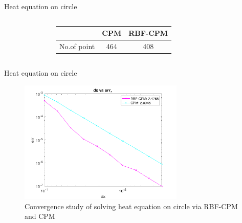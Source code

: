 \documentclass{beamer}
\begin{document}
\begin{frame}{Heat equation on circle}
\begin{columns}
\begin{figure}
\begin{subfigure}
            \end{subfigure}
        \end{figure}
    \pause
        \begin{table}[]
            \centering
            \begin{tabular}{c|c|c}
                 &  CPM & RBF-CPM\\
                 \hline \hline
                No.of point & 464 & 408 
            \end{tabular}
        \end{table}
    \end{columns}
\end{frame}

\begin{frame}{Heat equation on circle}
    \begin{figure}
        \centering
        \includegraphics[width=0.7\textwidth]{UBC_IAM_5min_talk/Figures/heat_circle/heat_circle_RM_phs3_convergence_uniform_Polytermpt_skip_1_order_check.png}
        \caption{Convergence study of solving heat equation on circle via RBF-CPM and CPM}
    \end{figure}
\end{frame}
\end{document}
